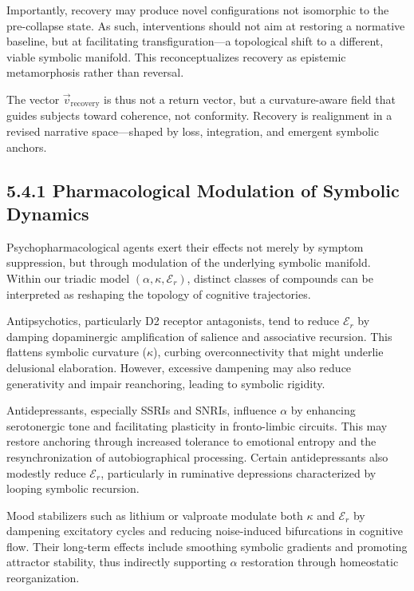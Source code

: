 Importantly, recovery may produce novel configurations not isomorphic to the pre-collapse state. As such, interventions should not aim at restoring a normative baseline, but at facilitating transfiguration—a topological shift to a different, viable symbolic manifold. This reconceptualizes recovery as epistemic metamorphosis rather than reversal.

The vector $\vec{v}_{\text{recovery}}$ is thus not a return vector, but a curvature-aware field that guides subjects toward coherence, not conformity. Recovery is realignment in a revised narrative space—shaped by loss, integration, and emergent symbolic anchors.
 
\subsection*{5.4.1 Pharmacological Modulation of Symbolic Dynamics}

Psychopharmacological agents exert their effects not merely by symptom suppression, but through modulation of the underlying symbolic manifold. Within our triadic model $(\alpha, \kappa, \mathcal{E}_r)$, distinct classes of compounds can be interpreted as reshaping the topology of cognitive trajectories.

Antipsychotics, particularly D2 receptor antagonists, tend to reduce $\mathcal{E}_r$ by damping dopaminergic amplification of salience and associative recursion. This flattens symbolic curvature ($\kappa$), curbing overconnectivity that might underlie delusional elaboration. However, excessive dampening may also reduce generativity and impair reanchoring, leading to symbolic rigidity.

Antidepressants, especially SSRIs and SNRIs, influence $\alpha$ by enhancing serotonergic tone and facilitating plasticity in fronto-limbic circuits. This may restore anchoring through increased tolerance to emotional entropy and the resynchronization of autobiographical processing. Certain antidepressants also modestly reduce $\mathcal{E}_r$, particularly in ruminative depressions characterized by looping symbolic recursion.

Mood stabilizers such as lithium or valproate modulate both $\kappa$ and $\mathcal{E}_r$ by dampening excitatory cycles and reducing noise-induced bifurcations in cognitive flow. Their long-term effects include smoothing symbolic gradients and promoting attractor stability, thus indirectly supporting $\alpha$ restoration through homeostatic reorganization.


